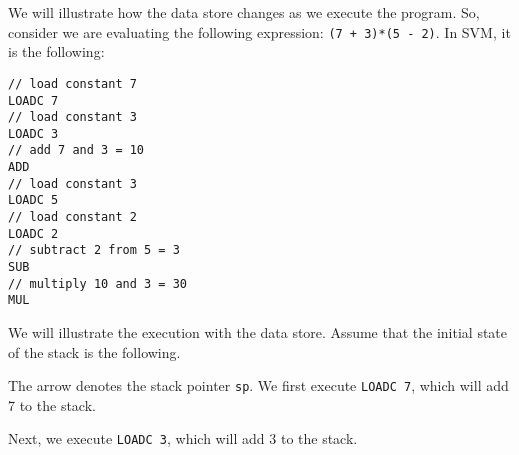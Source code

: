 \documentclass[a4paper, openany]{memoir}
\begin{document}
We will illustrate how the data store changes as we execute the program. So, consider we are evaluating the following expression: \texttt{(7 + 3)*(5 - 2)}. In SVM, it is the following:
\begin{lstlisting}[language=SVM]
// load constant 7
LOADC 7
// load constant 3
LOADC 3
// add 7 and 3 = 10
ADD
// load constant 3
LOADC 5
// load constant 2
LOADC 2
// subtract 2 from 5 = 3
SUB
// multiply 10 and 3 = 30
MUL
\end{lstlisting}
We will illustrate the execution with the data store. Assume that the initial state of the stack is the following.
\begin{figure}[H]
    \centering
\end{figure}
\noindent The arrow denotes the stack pointer \texttt{sp}. We first execute \texttt{LOADC 7}, which will add 7 to the stack.
\begin{figure}[H]
    \centering
\end{figure}
\noindent Next, we execute \texttt{LOADC 3}, which will add 3 to the stack.
\begin{figure}[H]
    \centering
\end{figure}
\end{document}
